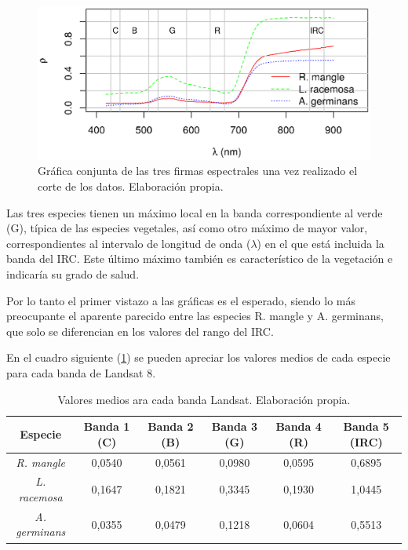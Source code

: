 
\begin{figure}
	\centering
	\includegraphics[width=0.8\linewidth]{./Imagenes/ralcorte.eps}
	\caption[Firmas espectrales cortadas de las tres especies]{Gráfica conjunta de las tres firmas espectrales una vez realizado el corte de los datos. Elaboración propia.}
	\label{fig:ral_corte}
\end{figure}

Las tres especies tienen un máximo local en la banda correspondiente al verde (G), típica de las especies vegetales, así como otro máximo de mayor valor, correspondientes al intervalo de longitud de onda ($\lambda$) en el que está incluida la banda del \ac{IRC}. Este último máximo también es característico de la vegetación e indicaría su grado de salud.%

Por lo tanto el primer vistazo a las gráficas es el esperado, siendo lo más preocupante el aparente parecido entre las especies R. mangle y A. germinans, que solo se diferencian en los valores del rango del \ac{IRC}.%

En el cuadro siguiente (\ref{tab:valores_medios}) se pueden apreciar los valores medios de cada especie para cada banda de Landsat 8.

\begin{table}[ht]
	\centering
	\begin{tabular}{@{}cccccc@{}}
	\toprule[0.4mm]
	Especie & Banda 1 (C) & Banda 2 (B) & Banda 3 (G) & Banda 4 (R) & Banda 5 (IRC) \\
	\midrule
	\textit{R. mangle}	& 0,0540 & 0,0561 & 0,0980 & 0,0595 & 0,6895 \\
	\textit{L. racemosa} & 0,1647 & 0,1821 & 0,3345 & 0,1930 & 1,0445 \\
	\textit{A. germinans} & 0,0355 & 0,0479 & 0,1218 & 0,0604 & 0,5513 \\
	\bottomrule[0.4mm]
	\end{tabular}
	\caption[Valores medios en las bandas Landsat]{Valores medios ara cada banda Landsat. Elaboración propia.}
	\label{tab:valores_medios}
\end{table}


